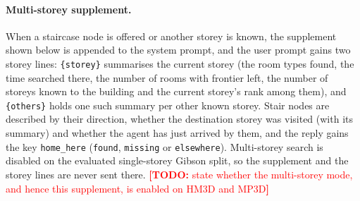\documentclass[10pt]{article}
\newcommand{\TODO}[1]{\textcolor{red}{\textbf{[TODO:} #1\textbf{]}}}
\begin{document}
\paragraph{Multi-storey supplement.} When a staircase node is offered or another storey is known, the supplement shown below is appended to the system prompt, and the user prompt gains two storey lines: \texttt{\{storey\}} summarises the current storey (the room types found, the time searched there, the number of rooms with frontier left, the number of storeys known to the building and the current storey's rank among them), and \texttt{\{others\}} holds one such summary per other known storey. Stair nodes are described by their direction, whether the destination storey was visited (with its summary) and whether the agent has just arrived by them, and the reply gains the key \texttt{home\_here} (\texttt{found}, \texttt{missing} or \texttt{elsewhere}). Multi-storey search is disabled on the evaluated single-storey Gibson split, so the supplement and the storey lines are never sent there. \TODO{state whether the multi-storey mode, and hence this supplement, is enabled on HM3D and MP3D}
\end{document}
